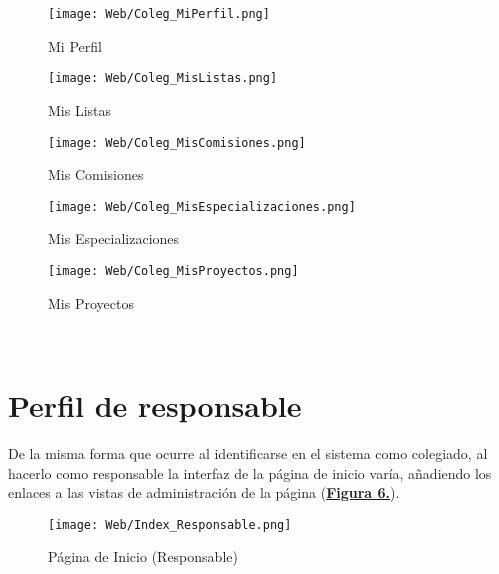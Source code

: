 \begin{figure}[!htbp]
  \centering
  \texttt{[image: Web/Coleg\_MiPerfil.png]}
  \caption{Mi Perfil}
  \label{fig:Web_Coleg_MiPerfil}
\end{figure}
\FloatBarrier

\begin{figure}[!htbp]
  \centering
  \texttt{[image: Web/Coleg\_MisListas.png]}
  \caption{Mis Listas}
  \label{fig:Web_Coleg_MisListas}
\end{figure}
\FloatBarrier

\begin{figure}[!htbp]
  \centering
  \texttt{[image: Web/Coleg\_MisComisiones.png]}
  \caption{Mis Comisiones}
  \label{fig:Web_Coleg_MisComisiones}
\end{figure}
\FloatBarrier

\begin{figure}[!htbp]
  \centering
  \texttt{[image: Web/Coleg\_MisEspecializaciones.png]}
  \caption{Mis Especializaciones}
  \label{fig:Web_Coleg_MisEspecializaciones}
\end{figure}
\FloatBarrier

\begin{figure}[!htbp]
  \centering
  \texttt{[image: Web/Coleg\_MisProyectos.png]}
  \caption{Mis Proyectos}
  \label{fig:Web_Coleg_MisProyectos}
\end{figure}
\FloatBarrier
\newpage~


\section{Perfil de responsable}
\addtocounter{figura_manual}{1} De la misma forma que ocurre al identificarse en el sistema como colegiado, al hacerlo como responsable la interfaz de la página de inicio varía, añadiendo los enlaces a las vistas de administración de la página (\textbf{\hyperref[fig:Web_Index_Responsable]{Figura 6.}}).

\begin{figure}[!htbp]
  \centering
  \texttt{[image: Web/Index\_Responsable.png]}
  \caption{Página de Inicio (Responsable)}
  \label{fig:Web_Index_Responsable}
\end{figure}
\FloatBarrier

